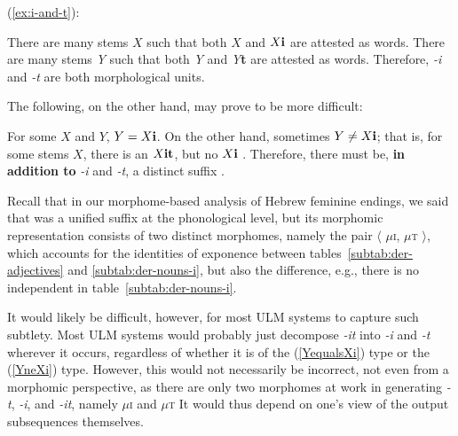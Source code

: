 (\ref{ex:i-and-t}): 
\begin{exe} \label{ex:observations1}
\ex There are many stems $X$ such that both $X$ and $X\text{\textbf{i}}$ are 
attested as words. \label{ex:Xi}
 \ex There are many stems \textit{Y} such that both \textit{Y} and \textit{Y}\textbf{t} 
 are attested as words. \label{ex:Yi}
\ex Therefore, \textit{-i} and \textit{-t} are both morphological units. \label{ex:i-and-t}
\end{exe}

The following, on the other hand, may prove to be more difficult:
\begin{exe} \label{ex:observations2}
\ex  For some $X$ and $Y$, $Y=X\text{\textbf{i}}$. \label{ex:YequalsXi} 
\ex  On the other hand, sometimes $Y \ne X\text{\textbf{i}}$; that is, for some stems 
$X$, there is an $X\text{\textbf{it}}$, but no $X\text{\textbf{i}}$ . \label{YneXi}
\ex Therefore, there must be, \textbf{in addition to} \textit{-i} and \textit{-t}, 
a distinct suffix .
\end{exe}
Recall that in our morphome-based analysis of Hebrew feminine endings, we said 
that  was a unified suffix at the phonological level, but its morphomic 
representation consists of two distinct morphomes, namely the pair 
$\langle$ $\mu$\textsc{i}, $\mu$\textsc{t} $\rangle$, which accounts
for the identities of exponence between tables~\ref{subtab:der-adjectives} 
and \ref{subtab:der-nouns-i}, but also the difference, e.g., there is no independent
 in table~\ref{subtab:der-nouns-i}. 

It would likely be difficult, however, for most \ac{ULM} systems to capture such subtlety. 
Most \ac{ULM} systems would probably just decompose \textit{-it} 
into \textit{-i} and \textit{-t} wherever it occurs, regardless of whether it is of the
 (\ref{YequalsXi}) type or the (\ref{YneXi}) type. However, 
 this would not necessarily be incorrect, not even from a morphomic perspective,
 as there are only two morphomes at work in generating \textit{-t}, \textit{-i}, and \textit{-it}, 
 namely $\mu$\textsc{i} and $\mu$\textsc{t} 
It would thus depend on one's view of the output subsequences themselves.

